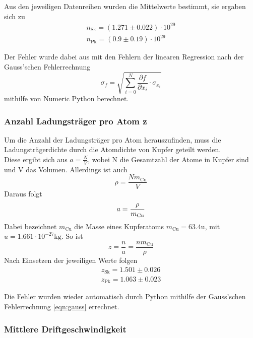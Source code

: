 \noindent Aus den jeweiligen Datenreihen wurden die Mittelwerte bestimmt, sie ergaben sich zu
\begin{align*}
n_\text{Sk} = \left( 1.271 \pm 0.022 \right) \cdot 10^{29}\\
n_\text{Pk} = \left( 0.9\pm 0.19 \right) \cdot 10^{29}
\end{align*}

Der Fehler wurde dabei aus mit den Fehlern der linearen Regression nach der Gauss'schen Fehlerrechnung
\begin{equation}
\sigma_f = \sqrt{\sum_{i=0}^{N} {\frac{\partial f}{\partial x_i} \cdot \sigma_{x_i}}}
\label{eqn:gauss}
\end{equation}
mithilfe von Numeric Python berechnet.

\subsubsection{Anzahl Ladungsträger pro Atom z}

Um die Anzahl der Ladungsträger pro Atom herauszufinden, muss die Ladungsträgerdichte durch 
die Atomdichte von Kupfer geteilt werden.\\
Diese ergibt sich aus $a = \frac{N}{V}$, wobei N die Gesamtzahl der Atome in Kupfer sind und V das Volumen. 
Allerdings ist auch 
\begin{equation*}
\rho = \frac{N m_\text{Cu}}{V}
\end{equation*}
Daraus folgt
\begin{equation*}
a = \frac{\rho}{m_\text{Cu}} \\
\end{equation*}
Dabei bezeichnet $m_\text{Cu}$ die Masse eines Kupferatoms $m_\text{Cu} = 63.4 \si{\atomicmassunit}$, mit $u = 1.661 \cdot 10^{-27}\si{\kilo\g}$.
So ist
\begin{equation}
z = \frac{n}{a} = \frac{n m_\text{Cu}}{\rho}
\end{equation}
Nach Einsetzen der jeweiligen Werte folgen
\begin{align*}
z_\text{Sk} = 1.501 \pm 0.026\\
z_\text{Pk} = 1.063 \pm 0.023
\end{align*}

Die Fehler wurden wieder automatisch durch Python mithilfe der Gauss'schen Fehlerrechnung 
\eqref{eqn:gauss} errechnet.

\subsubsection{Mittlere Driftgeschwindigkeit}

